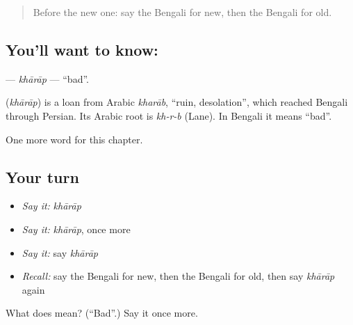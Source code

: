 \begin{quote}
Before the new one: say the Bengali for new, then the Bengali for old.
\end{quote}

\subsection*{You'll want to know: }
\textbf{} — \emph{khārāp} — \textquotedblleft{}bad\textquotedblright{}.

\begin{cousinweb}
\textbf{} (\emph{khārāp}) is a loan from Arabic \emph{kharāb}, \textquotedblleft{}ruin, desolation\textquotedblright{}, which reached Bengali through Persian. Its Arabic root is \emph{kh-r-b} (Lane). In Bengali it means \textquotedblleft{}bad\textquotedblright{}.
\end{cousinweb}

\begin{grammarlens}[title={What you've built}]
One more word for this chapter.
\end{grammarlens}

\subsection*{Your turn}
\begin{itemize}
\raggedright
  \item \emph{Say it:} \emph{khārāp}
  \item \emph{Say it:} \emph{khārāp}, once more
  \item \emph{Say it:} say \emph{khārāp}
  \item \emph{Recall:} say the Bengali for new, then the Bengali for old, then say \emph{khārāp} again
\end{itemize}

\begin{tcolorbox}[breakable,colback=teal!4,colframe=teal!35!black,title={Before you move on}]
What does  mean? (\textquotedblleft{}Bad\textquotedblright{}.) Say it once more.
\end{tcolorbox}
